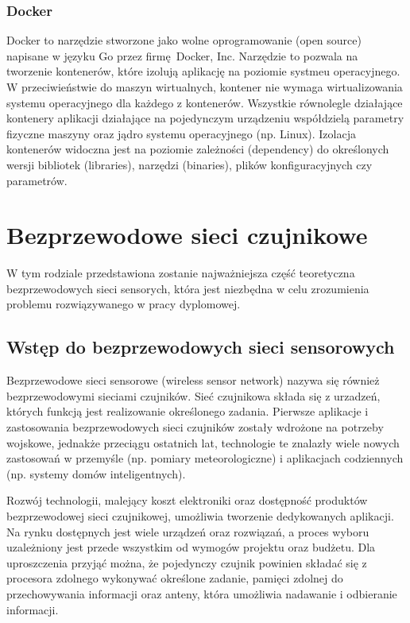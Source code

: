 \documentclass[a4paper,12pt,twoside,openany]{report}
\begin{document}
\subsection{Docker}

Docker to narzędzie stworzone jako wolne oprogramowanie (open source) napisane w języku Go przez firmę Docker, Inc.
Narzędzie to pozwala na tworzenie kontenerów, które izolują aplikację na poziomie systmeu operacyjnego. W przeciwieństwie do maszyn wirtualnych, kontener nie wymaga
wirtualizowania systemu operacyjnego dla każdego z kontenerów. Wszystkie równolegle działające kontenery aplikacji działające na pojedynczym urządzeniu współdzielą
parametry fizyczne maszyny oraz jądro systemu operacyjnego (np. Linux). Izolacja kontenerów widoczna jest na poziomie zależności (dependency) do określonych wersji
bibliotek (libraries), narzędzi (binaries), plików konfiguracyjnych czy parametrów.

\chapter{Bezprzewodowe sieci czujnikowe}

W tym rodziale przedstawiona zostanie najważniejsza część teoretyczna bezprzewodowych sieci sensorych, która jest niezbędna w celu zrozumienia problemu
rozwiązywanego w pracy dyplomowej.

\section{Wstęp do bezprzewodowych sieci sensorowych}
Bezprzewodowe sieci sensorowe (wireless sensor network) nazywa się również bezprzewodowymi sieciami czujników.
Sieć czujnikowa składa się z urzadzeń, których funkcją jest realizowanie określonego zadania.
Pierwsze aplikacje i zastosowania bezprzewodowych sieci czujników zostały wdrożone na potrzeby wojskowe, jednakże przeciągu ostatnich lat, technologie te znalazły
wiele nowych zastosowań w przemyśle (np. pomiary meteorologiczne) i aplikacjach codziennych (np. systemy domów inteligentnych).

Rozwój technologii, malejący koszt elektroniki oraz dostępność produktów bezprzewodowej sieci czujnikowej, umożliwia tworzenie dedykowanych aplikacji.
Na rynku dostępnych jest wiele urządzeń oraz rozwiązań, a proces wyboru uzależniony jest przede wszystkim od wymogów projektu oraz budżetu.
Dla uproszczenia przyjąć można, że pojedynczy czujnik powinien składać się z procesora zdolnego wykonywać określone zadanie, pamięci zdolnej do przechowywania informacji
oraz anteny, która umożliwia nadawanie i odbieranie informacji.
\end{document}
